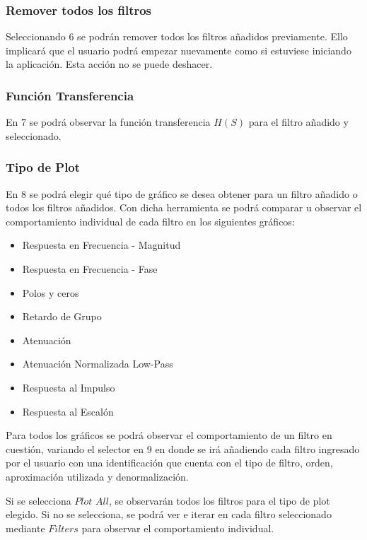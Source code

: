 \subsubsection{Remover todos los filtros}

Seleccionando $6$ se podrán remover todos los filtros añadidos previamente. Ello implicará que el usuario podrá empezar nuevamente
como si estuviese iniciando la aplicación. Esta acción no se puede deshacer.

\subsubsection{Función Transferencia}

En $7$ se podrá observar la función transferencia $H(S)$ para el filtro añadido y seleccionado.

\subsubsection{Tipo de Plot}

En $8$ se podrá elegir qué tipo de gráfico se desea obtener para un filtro añadido o todos los filtros añadidos.
Con dicha herramienta se podrá comparar u observar el comportamiento individual de cada filtro en los siguientes gráficos:

\begin{itemize}
	\item Respuesta en Frecuencia - Magnitud
	\item Respuesta en Frecuencia - Fase
	\item Polos y ceros
	\item Retardo de Grupo
	\item Atenuación
	\item Atenuación Normalizada Low-Pass
	\item Respuesta al Impulso
	\item Respuesta al Escalón
\end{itemize}

Para todos los gráficos se podrá observar el comportamiento de un filtro en cuestión, variando el selector en $9$ en donde 
se irá añadiendo cada filtro ingresado por el usuario con una identificación que cuenta con el tipo de filtro, orden, aproximación
utilizada y denormalización.

Si se selecciona $Plot$ $All$, se observarán todos los filtros para el tipo de plot elegido. Si no se selecciona,
se podrá ver e iterar en cada filtro seleccionado mediante $Filters$ para observar el comportamiento individual.


